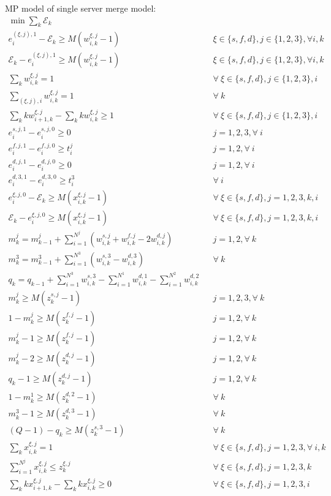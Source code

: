 \documentclass[]{interact}
\theoremstyle{plain}%
\theoremstyle{definition}
\theoremstyle{remark}
\begin{document}
MP model of single server merge model:
\begin{eqnarray}
\min{\sum_{k}\mathcal{E}_k}\\
e^{(\xi,j),1}_i - \mathcal{E}_{k}\ge M(w^{\xi,j}_{i,k}-1)&&\xi\in\{s,f,d\}, j\in\{1,2,3\},\forall i,k \\
\mathcal{E}_{k} - e^{(\xi,j),1}_i\ge M(w^{\xi,j}_{i,k}-1)&&\xi\in\{s,f,d\}, j\in\{1,2,3\},\forall i,k \\
\sum_{k} w^{\xi,j}_{i,k} =1&& \forall\ \xi\in\{s,f,d\}, j\in\{1,2,3\},i\\
\sum_{(\xi,j),i} w^{\xi,j}_{i,k} =1&& \forall\ k\\
\sum_{k} kw^{\xi,j}_{i+1,k} - \sum_{k} kw^{\xi,j}_{i,k} \ge 1&& \forall\  \xi\in\{s,f,d\}, j\in\{1,2,3\},i\\
e^{s,j,1}_{i} - e^{s,j,0}_{i} \ge 0 && j =1,2,3, \forall \ i\\
e^{f,j,1}_{i} - e^{f,j,0}_{i} \ge t^j_{i}&& j =1,2, \forall \ i\\
e^{d,j,1}_{i} - e^{d,j,0}_{i} \ge 0 && j =1,2, \forall \ i\\
e^{d,3,1}_{i} - e^{d,3,0}_{i} \ge t^3_{i}&&\forall \ i \\
e^{\xi,j,0}_i-\mathcal{E}_{k} \ge M(x^{\xi,j}_{i,k}-1)&& \forall\ \xi\in\{s,f,d\},j=1,2,3,k,i\\
\mathcal{E}_{k} -e^{\xi,j,0}_i\ge M(x^{\xi,j}_{i,k}-1)&& \forall\ \xi\in\{s,f,d\},j=1,2,3,k,i\\
m^j_k=m^j_{k-1} + \sum_{i=1}^{N^{j}} (w^{s,j}_{i,k}  + w^{f,j}_{i,k} - 2w^{d,j}_{i,k})&& j=1,2, \forall\ k\\
m^3_k=m^3_{k-1} + \sum_{i=1}^{N^{3}} (w^{s,3}_{i,k} - w^{d,3}_{i,k})&&\forall\ k\\
q_k = q_{k-1} + \sum_{i=1}^{N^{3}} w^{s,3}_{i,k} - \sum_{i=1}^{N^{1}} w^{d,1}_{i,k} - \sum_{i=1}^{N^{2}} w^{d,2}_{i,k}\\
m^j_k \ge M(z^{s,j}_{k}-1)&& j=1,2,3, \forall \ k\\
1- m^j_k \ge M(z^{f,j}_{k}-1)&& j=1,2, \forall \ k\\
m^j_k - 1 \ge M(z^{f,j}_{k}-1)&& j=1,2, \forall \ k\\
m^j_k - 2 \ge M(z^{d,j}_{k}-1)&& j=1,2, \forall \ k\\
q_k - 1 \ge M(z^{d,j}_{k}-1)&&  j=1,2, \forall \ k\\
1 - m^1_k \ge M(z^{d,2}_{k}-1)&& \forall\ k\\
m^3_k - 1 \ge M(z^{d,3}_{k}-1)&& \forall \ k\\
(Q-1) - q_k \ge M(z^{s,3}_{k}-1)&& \forall\ k\\
\sum_{k} x^{\xi,j}_{i,k} =1&& \forall\ \xi\in\{s,f,d\}, j=1,2,3, \forall\ i,k\\
\sum_{i=1}^{N^{j}}x^{\xi,j}_{i,k} \le z^{\xi,j}_{k}&& \forall\ \xi\in\{s,f,d\}, j=1,2,3, k\\
\sum_{k} kx^{\xi,j}_{i+1,k} - \sum_{k} kx^{\xi,j}_{i,k} \ge 0 && \forall\ \xi\in\{s,f,d\}, j=1,2,3, i
\end{eqnarray}
\end{document}
